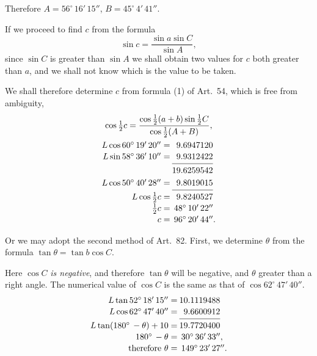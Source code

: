 \documentclass{book}[2004/02/16]
\begin{document}
\begin{mainmatter}
\begin{spacing}{1.3}
Therefore\quad\hfill
$A = 56^\circ\, 16'\, 15''$, \quad
$B = 45^\circ\,  4'\, 41''$. \hfill\phantom{\indent Therefore}

If we proceed to find $c$ from the formula
\[
\sin c = \dfrac{\sin a \sin C}{\sin A},
\]
since $\sin C$ is greater than $\sin A$ we shall obtain two values for $c$
both greater than $a$, and we shall not know which is the value to
be taken.

We shall therefore determine $c$ from formula (1) of Art.~54,
which is free from ambiguity,
\begin{gather*}
\cos \tfrac{1}{2} c = \dfrac{\cos \tfrac{1}{2} (a + b) \sin \tfrac{1}{2}C}{\cos\tfrac{1}{2}(A+B)}, \\
\begin{array}{r@{\:}r@{}c}
  L \cos 60^\circ\, 19'\, 20'' = & 9.6947120 \\[.3ex]
  L \sin 58^\circ\, 36'\, 10'' = & 9.9312422 \\[-1.5ex]
&\hrulefill\\[-.3ex]
                                 & 19.6259542 \\[.6ex]
  L \cos 50^\circ\, 40'\, 28'' = & 9.8019015 \\[-1.5ex]
&\hrulefill\\[-.3ex]
  L \cos \tfrac{1}{2} c        = & 9.8240527 \\[.3ex]
  \tfrac{1}{2} c =
&\multicolumn{2}{@{\:}l}{ 48^\circ\, 10'\, 22''} \\[.3ex]
  c =
&\multicolumn{2}{@{\:}l}{ 96^\circ\, 20'\, 44''.}
\end{array}
\end{gather*}

Or we may adopt the second method of Art.~82. First, we
determine $\theta$ from the formula $\tan \theta = \tan b \cos C$.

Here $\cos C$ \textit{is negative}, and therefore $\tan \theta$ will be negative,
and $\theta$ greater than a right angle. The numerical value of $\cos C$ is
the same as that of $\cos 62^\circ\, 47'\, 40''$.
\[
\begin{array}{r@{\:}r@{}c}
  L \tan 52^\circ\, 18'\, 15''       = & 10.1119488 \\[.3ex]
  L \cos 62^\circ\, 47'\, 40''       = &  9.6600912 \\[-1.5ex]
&\hrulefill\\[-.3ex]
  L \tan (180^\circ\, - \theta) + 10 = & 19.7720400 \\[.3ex]
  180^\circ\, - \theta =
&\multicolumn{2}{@{\:}l}{ 30^\circ\, 36'\, 33'',} \\[.3ex]
\text{therefore }\theta =
&\multicolumn{2}{@{\:}l}{ 149^\circ\, 23'\, 27''.}
\end{array}
\]


\end{spacing}
\end{mainmatter}
\end{document}
